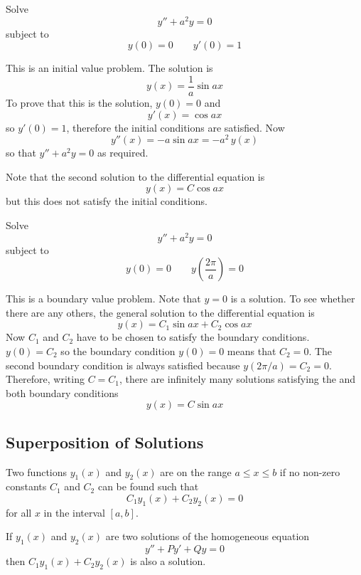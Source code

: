 \begin{example}
\problem
Solve 
$$y''+a^2y=0$$
subject to
$$y(0)=0\qquad y'(0)=1$$

\solution
This is an initial value problem.  The solution is
$$y(x)=\frac{1}{a}\sin ax$$
To prove that this is the solution, $y(0)=0$ and
$$y'(x)=\cos ax$$
so $y'(0)=1$, therefore the initial conditions are satisfied.  Now
$$y''(x)=-a\sin ax=-a^2\,y(x)$$
so that $y''+a^2y=0$ as required.

Note that the second solution to the differential equation is 
$$y(x)=C\cos ax$$
but this does not satisfy the initial conditions.
\end{example}

\begin{example}
\problem Solve 
$$y''+a^2y=0$$
subject to
$$y(0)=0\qquad y\left(\frac{2\pi}{a}\right)=0$$

\solution
This is a boundary value problem.  Note that $y=0$ is a solution.  To see
whether there are any others, the general solution to the differential
equation is
$$y(x)=C_1\sin ax + C_2\cos ax$$
Now $C_1$ and $C_2$ have to be chosen to satisfy the boundary conditions.
$y(0)=C_2$ so the boundary condition $y(0)=0$ means that $C_2=0$.
The second boundary condition is always satisfied because
$y\left(2\pi/a\right)=C_2=0$. 
Therefore, writing $C=C_1$, there are infinitely many solutions satisfying
the \ODE and both boundary conditions
$$y(x)=C\sin ax$$
\end{example}

\subsection{Superposition of Solutions}

Two functions $y_1(x)$ and $y_2(x)$ are  on the
range $a\leq x\leq b$ if no non-zero constants $C_1$ and $C_2$ can be found
such that
$$C_1y_1(x)+C_2y_2(x)=0$$
for all $x$ in the interval $[a,b]$.


\begin{theorem}
If $y_1(x)$ and $y_2(x)$ are two solutions of the homogeneous equation
$$y''+Py'+Qy=0$$
then $C_1y_1(x)+C_2y_2(x)$ is also a solution.
\end{theorem}

